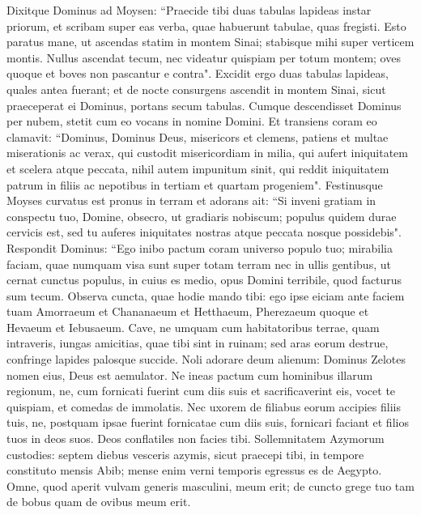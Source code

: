\begin{biblechapter}  
\verse Dixitque Dominus ad Moysen: “Praecide tibi duas tabulas lapideas instar priorum, et scribam super eas verba, quae habuerunt tabulae, quas fregisti. 
\verse Esto paratus mane, ut ascendas statim in montem Sinai; stabisque mihi super verticem montis. 
\verse Nullus ascendat tecum, nec videatur quispiam per totum montem; oves quoque et boves non pascantur e contra". 
\verse Excidit ergo duas tabulas lapideas, quales antea fuerant; et de nocte consurgens ascendit in montem Sinai, sicut praeceperat ei Dominus, portans secum tabulas. 
\verse Cumque descendisset Dominus per nubem, stetit cum eo vocans in nomine Domini. 
\verse Et transiens coram eo clamavit: “Dominus, Dominus Deus, misericors et clemens, patiens et multae miserationis ac verax, 
\verse qui custodit misericordiam in milia, qui aufert iniquitatem et scelera atque peccata, nihil autem impunitum sinit, qui reddit iniquitatem patrum in filiis ac nepotibus in tertiam et quartam progeniem". 
\verse Festinusque Moyses curvatus est pronus in terram et adorans 
\verse ait: “Si inveni gratiam in conspectu tuo, Domine, obsecro, ut gradiaris nobiscum; populus quidem durae cervicis est, sed tu auferes iniquitates nostras atque peccata nosque possidebis". 
\verse Respondit Dominus: “Ego inibo pactum coram universo populo tuo; mirabilia faciam, quae numquam visa sunt super totam terram nec in ullis gentibus, ut cernat cunctus populus, in cuius es medio, opus Domini terribile, quod facturus sum tecum. 
\verse Observa cuncta, quae hodie mando tibi: ego ipse eiciam ante faciem tuam Amorraeum et Chananaeum et Hetthaeum, Pherezaeum quoque et Hevaeum et Iebusaeum. 
\verse Cave, ne umquam cum habitatoribus terrae, quam intraveris, iungas amicitias, quae tibi sint in ruinam; 
\verse sed aras eorum destrue, confringe lapides palosque succide. 
\verse Noli adorare deum alienum: Dominus Zelotes nomen eius, Deus est aemulator.  
\verse Ne ineas pactum cum hominibus illarum regionum, ne, cum fornicati fuerint cum diis suis et sacrificaverint eis, vocet te quispiam, et comedas de immolatis.  
\verse Nec uxorem de filiabus eorum accipies filiis tuis, ne, postquam ipsae fuerint fornicatae cum diis suis, fornicari faciant et filios tuos in deos suos. 
\verse Deos conflatiles non facies tibi. 
\verse Sollemnitatem Azymorum custodies: septem diebus vesceris azymis, sicut praecepi tibi, in tempore constituto mensis Abib; mense enim verni temporis egressus es de Aegypto. 
\verse Omne, quod aperit vulvam generis masculini, meum erit; de cuncto grege tuo tam de bobus quam de ovibus meum erit. 

\end{biblechapter}
